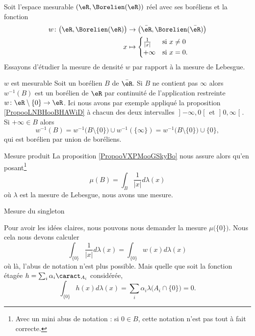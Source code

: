 \begin{example}      \label{EXooKQDRooVMWaEC}
    Soit l'espace mesurable \( (\eR,\Borelien(\eR))\) réel avec ses boréliens et la fonction
    \begin{equation}
        \begin{aligned}
            w\colon \big( \eR,\Borelien(\eR) \big)&\to\big( \bar \eR,\Borelien(\bar \eR) \big) \\
            x&\mapsto \begin{cases}
                \frac{1}{ | x | }    &   \text{si } x\neq 0\\
                +\infty    &    \text{si }x=0.
            \end{cases}
        \end{aligned}
    \end{equation}
    Essayons d'étudier la mesure de densité \( w\) par rapport à la mesure de Lebesgue.
    \begin{subproof}
    \item[\( w\) est mesurable]
    Soit un borélien \( B\) de \( \bar \eR\). Si \( B\) ne contient pas \( \infty\) alors \( w^{-1}(B)\) est un borélien de \( \eR\) par continuité de l'application restreinte \( w\colon \eR\setminus\{ 0 \}\to \eR \). Ici nous avons par exemple appliqué la proposition \ref{PropooLNBHooBHAWiD} à chacun des deux intervalles \( \mathopen] -\infty , 0 \mathclose[\) et \( \mathopen] 0 , \infty \mathclose[\). Si \( +\infty\in B\) alors
        \begin{equation}
            w^{-1}(B)=w^{-1}\big( B\setminus\{ 0 \} \big)\cup w^{-1}(\{ \infty \})=  w^{-1}\big( B\setminus\{ 0 \} \big)\cup \{ 0 \},
        \end{equation}
        qui est borélien par union de boréliens.
    \item[Mesure produit]
    La proposition \ref{PropooVXPMooGSkyBo} nous assure alors qu'en posant\footnote{Avec un mini abus de notation : si \( 0\in B\), cette notation n'est pas tout à fait correcte.}
    \begin{equation}
        \mu(B)=\int_B\frac{1}{ | x | }d\lambda(x)
    \end{equation}
    où \(  \lambda \) est la mesure de Lebesgue, nous avons une mesure.

\item[Mesure du singleton]

    Pour avoir les idées claires, nous pouvons nous demander la mesure \( \mu\big( \{ 0 \} \big)\). Nous cela nous devons calculer
    \begin{equation}
        \int_{\{ 0 \}}\frac{1}{ | x | }d\lambda(x)=\int_{\{ 0 \}}w(x)d\lambda(x)
    \end{equation}
    où là, l'abus de notation n'est plus possible. Mais quelle que soit la fonction étagée \( h=\sum_i\alpha_i\caract_{A_i}\) considérée, 
    \begin{equation}
        \int_{\{ 0 \}}h(x)d\lambda(x)=\sum_i\alpha_i\lambda\big( A_i\cap\{ 0 \} \big)=0.
    \end{equation}


\end{subproof}
\end{example}
